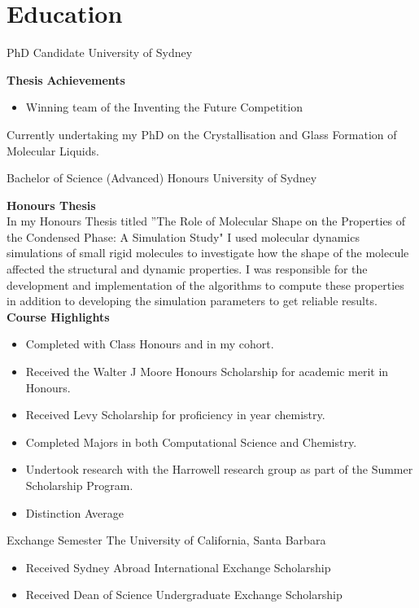 



\makecvtitle

\section{Education}

{PhD Candidate}
{University of Sydney}{}{}
{%
\textbf{Thesis}
 \textbf{Achievements}
  \begin{itemize}
    \item Winning team of the Inventing the Future Competition
  \end{itemize}
Currently undertaking my PhD on the Crystallisation and Glass Formation of Molecular Liquids.}

{Bachelor of Science (Advanced) Honours}
{University of Sydney}{}{}
{%
\textbf{Honours Thesis}\\
  In my Honours Thesis titled 
  ''The Role of Molecular Shape on the Properties of the Condensed Phase: A Simulation Study"
  I used molecular dynamics simulations of small rigid molecules to investigate how
  the shape of the molecule affected the structural and dynamic properties.
  I was responsible for the development and implementation of the algorithms to
  compute these properties in addition to developing the simulation parameters
  to get reliable results. \\
  \textbf{Course Highlights}
  \begin{itemize}
    \item Completed with  Class Honours and  in my cohort.
    \item Received the Walter J Moore Honours Scholarship for academic merit in Honours.
    \item Received Levy Scholarship for proficiency in  year chemistry.
    \item Completed Majors in both Computational Science and Chemistry.
    \item Undertook research with the Harrowell research group as part of the Summer Scholarship Program.
    \item Distinction Average
  \end{itemize}
}

{Exchange Semester}
{The University of California, Santa Barbara}{}{}
{%
\begin{itemize}
    \item Received Sydney Abroad International Exchange Scholarship
    \item Received Dean of Science Undergraduate Exchange Scholarship
 \end{itemize}
}

